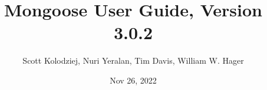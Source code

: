 \title{Mongoose User Guide, Version 3.0.2}
\author{Scott Kolodziej, Nuri Yeralan, Tim Davis, William W. Hager}
\date{Nov 26, 2022}
